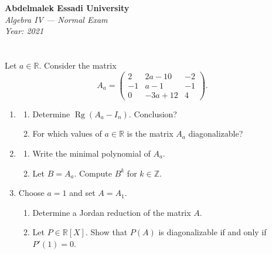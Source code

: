 \documentclass[12pt]{article}
\begin{document}
\begin{center}
  \Large\textbf{Abdelmalek Essadi University} \\[1em]
  \large\textit{Algebra IV — Normal Exam} \\[0.5em]
  \large\textit{Year: 2021} \\[2em]
\end{center}

\vspace{0.5cm}

\section{}
Let $a \in \mathbb{R}$. Consider the matrix
\[
A_a = \begin{pmatrix}
2 & 2a - 10 & -2 \\
-1 & a - 1 & -1 \\
0 & -3a + 12 & 4
\end{pmatrix}.
\]

\begin{enumerate}
    \item[1)] 
    \begin{enumerate}
        \item[1)] Determine $\operatorname{Rg}(A_a - I_n)$. Conclusion?
        \item[2)] For which values of $a \in \mathbb{R}$ is the matrix $A_a$ diagonalizable?
    \end{enumerate}

    \item[2)]
    \begin{enumerate}
        \item[1)] Write the minimal polynomial of $A_a$.
        \item[2)] Let $B = A_a$. Compute $B^k$ for $k \in \mathbb{Z}$.
    \end{enumerate}

    \item[3)] Choose $a = 1$ and set $A = A_1$.
    \begin{enumerate}
        \item[1)] Determine a Jordan reduction of the matrix $A$.
        \item[2)] Let $P \in \mathbb{R}[X]$. Show that $P(A)$ is diagonalizable if and only if $P'(1) = 0$.
    \end{enumerate}
\end{enumerate}
\end{document}

